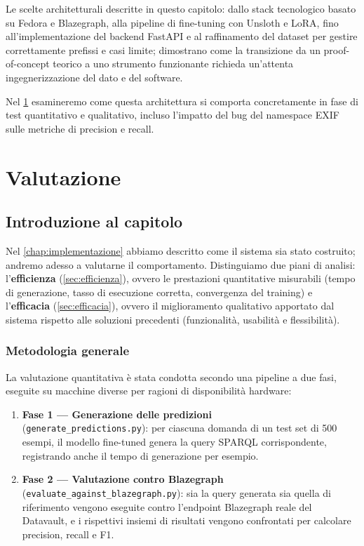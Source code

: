 \documentclass[12pt,a4paper,oneside]{book}
\newcommand{\code}[1]{\colorbox{light-gray}{\texttt{#1}}}
\begin{document}
Le scelte architetturali descritte in questo capitolo: dallo stack tecnologico basato su Fedora e Blazegraph, alla pipeline di fine-tuning con Unsloth e LoRA, fino all'implementazione del backend FastAPI e al raffinamento del dataset per gestire correttamente prefissi e casi limite; dimostrano come la transizione da un proof-of-concept teorico a uno strumento funzionante richieda un'attenta ingegnerizzazione del dato e del software.

Nel \cref{chap:valutazione} esamineremo come questa architettura si comporta concretamente in fase di test quantitativo e qualitativo, incluso l'impatto del bug del namespace EXIF sulle metriche di precision e recall.
 
\chapter{Valutazione}\label{chap:valutazione}

\section{Introduzione al capitolo}\label{sec:intro_cap5}

Nel \cref{chap:implementazione} abbiamo descritto come il sistema sia stato costruito; andremo adesso a valutarne il comportamento. Distinguiamo due piani di analisi: l'\textbf{efficienza} (\cref{sec:efficienza}), ovvero le prestazioni quantitative misurabili (tempo di generazione, tasso di esecuzione corretta, convergenza del training) e l'\textbf{efficacia} (\cref{sec:efficacia}), ovvero il miglioramento qualitativo apportato dal sistema rispetto alle soluzioni precedenti (funzionalità, usabilità e flessibilità).

\subsection{Metodologia generale}\label{subsec:metodologia}

La valutazione quantitativa è stata condotta secondo una pipeline a due fasi, eseguite su macchine diverse per ragioni di disponibilità hardware:


\begin{enumerate}
    \item \textbf{Fase 1 --- Generazione delle predizioni} \\ 
    (\code{generate\_predictions.py}): per ciascuna domanda di un test set di 500 esempi, il modello fine-tuned genera la query SPARQL corrispondente, registrando anche il tempo di generazione per esempio.
    \item \textbf{Fase 2 --- Valutazione contro Blazegraph} \\
    (\code{evaluate\_against\_blazegraph.py}): sia la query generata sia quella di riferimento vengono eseguite contro l'endpoint Blazegraph reale del Datavault, e i rispettivi insiemi di risultati vengono confrontati per calcolare precision, recall e F1.
\end{enumerate}
\end{document}
